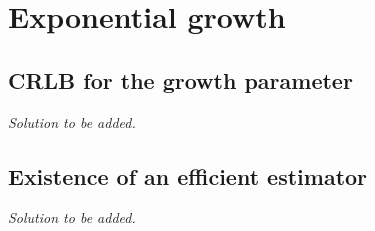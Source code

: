 \section{Exponential growth}

\subsection{CRLB for the growth parameter}

\emph{Solution to be added.}

\subsection{Existence of an efficient estimator}

\emph{Solution to be added.}
